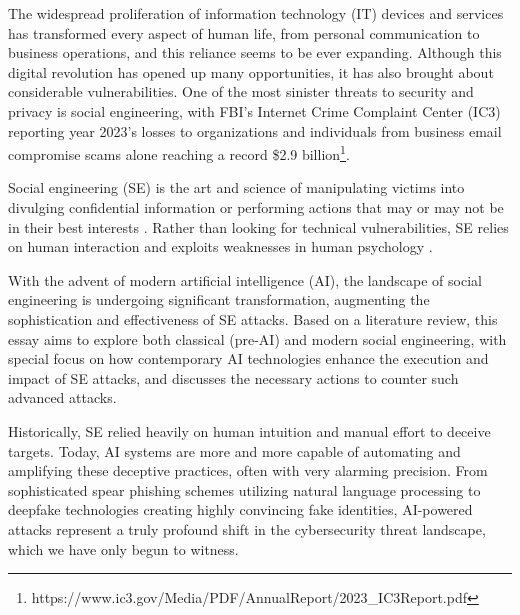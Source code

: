 The widespread proliferation of information technology (IT) devices and services has transformed every aspect of human life, from personal communication to business operations, and this reliance seems to be ever expanding. Although this digital revolution has opened up many opportunities, it has also brought about considerable vulnerabilities. One of the most sinister threats to security and privacy is social engineering, with FBI's Internet Crime Complaint Center (IC3) reporting year 2023's losses to organizations and individuals from business email compromise scams alone reaching a record \$2.9 billion\footnote{https://www.ic3.gov/Media/PDF/AnnualReport/2023\_IC3Report.pdf}.

Social engineering (SE) is the art and science of manipulating victims into divulging confidential information or performing actions that may or may not be in their best interests \citep{hadnagySocialEngineering2018}. Rather than looking for technical vulnerabilities, SE relies on human interaction and exploits weaknesses in human psychology \citep{wangDefiningSocialEngineering2020}.

With the advent of modern artificial intelligence (AI), the landscape of social engineering is undergoing significant transformation, augmenting the sophistication and effectiveness of SE attacks. Based on a literature review, this essay aims to explore both classical (pre-AI) and modern social engineering, with special focus on how contemporary AI technologies enhance the execution and impact of SE attacks, and discusses the necessary actions to counter such advanced attacks.


Historically, SE relied heavily on human intuition and manual effort to deceive targets. Today, AI systems are more and more capable of automating and amplifying these deceptive practices, often with very alarming precision. From sophisticated spear phishing schemes utilizing natural language processing to deepfake technologies creating highly convincing fake identities, AI-powered attacks represent a truly profound shift in the cybersecurity threat landscape, which we have only begun to witness.


